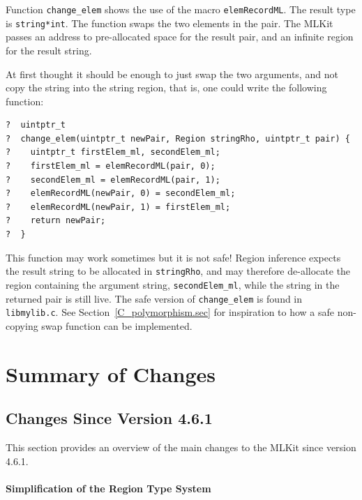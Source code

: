 \documentclass[12pt]{book}
\begin{document}
\begin{example}\label{change_elem.ex}
  Function \texttt{change\_elem} shows the use of
  the macro \texttt{elemRecordML}. The result type is \texttt{string*int}. The
  function swaps the two elements in the pair. The MLKit passes an address to
  pre-allocated space for the result pair, and an infinite region for the
  result string.

  At first thought it should be enough to just swap the two arguments, and
  not copy the string into the string region, that is, one could write the
  following function:
\begin{verbatim}
?  uintptr_t
?  change_elem(uintptr_t newPair, Region stringRho, uintptr_t pair) {
?    uintptr_t firstElem_ml, secondElem_ml;
?    firstElem_ml = elemRecordML(pair, 0);
?    secondElem_ml = elemRecordML(pair, 1);
?    elemRecordML(newPair, 0) = secondElem_ml;
?    elemRecordML(newPair, 1) = firstElem_ml;
?    return newPair;
?  }
\end{verbatim}
  This function may work sometimes but it is not safe! Region
  inference expects the result string to be allocated in
  \texttt{stringRho}, and may therefore de-allocate the region
  containing the argument string, \verb|secondElem_ml|, while the
  string in the returned pair is still live. The safe version of
  \verb|change_elem| is found in \verb|libmylib.c|. See
  Section~\ref{C_polymorphism.sec} for inspiration to how a safe
  non-copying swap function can be implemented.
\end{example}


\chapter{Summary of Changes}

\section{Changes Since Version 4.6.1}
%

This section provides an overview of the main changes to the MLKit
since version 4.6.1.

\subsubsection*{Simplification of the Region Type System}
\end{document}
